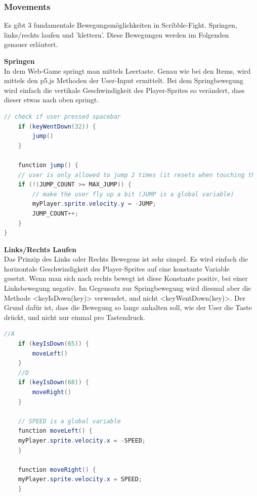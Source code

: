 \subsubsection{Movements}
Es gibt 3 fundamentale Bewegungsmöglichkeiten in Scribble-Fight. Springen, links/rechts laufen und 'klettern'. Diese Bewegungen werden im Folgenden genauer erläutert.

\textbf{Springen}
\\
In dem Web-Game springt man mittels Leertaste. Genau wie bei den Items, wird mittels den p5.js Methoden der User-Input ermittelt.
Bei dem Springbewegung wird einfach die vertikale Geschwindigkeit des Player-Sprites so verändert, dass dieser etwas nach oben springt.
\\
\begin{lstlisting}[caption=Jumping,language=Java,label=lst:impl:jumping]
    // check if user pressed spacebar
    if (keyWentDown(32)) {
        jump()
    }

    function jump() {
    // user is only allowed to jump 2 times (it resets when touching the ground)
    if (!(JUMP_COUNT >= MAX_JUMP)) {
        // make the user fly up a bit (JUMP is a global variable)
        myPlayer.sprite.velocity.y = -JUMP;
        JUMP_COUNT++;
    }
}
\end{lstlisting}

\textbf{Links/Rechts Laufen}
\\
Das Prinzip des Links oder Rechts Bewegens ist sehr simpel. Es wird einfach die horizontale Geschwindigkeit des Player-Sprites auf eine konstante Variable gesetzt.
Wenn man sich nach rechts bewegt ist diese Konstante positiv, bei einer Linksbewegung negativ. Im Gegensatz zur Springbewegung wird diesmal aber die Methode <keyIsDown(key)> verwendet, und nicht <keyWentDown(key)>.
Der Grund dafür ist, dass die Bewegung so lange anhalten soll, wie der User die Taste drückt, und nicht nur einmal pro Tastendruck.

\begin{lstlisting}[caption=Links/Rechts-Movement,language=Java,label=lst:impl:moving]
    //A
    if (keyIsDown(65)) {
        moveLeft()
    }
    //D
    if (keyIsDown(68)) {
        moveRight()
    }

    // SPEED is a global variable
    function moveLeft() {
    myPlayer.sprite.velocity.x = -SPEED;
    }

    function moveRight() {
    myPlayer.sprite.velocity.x = SPEED;
    }
\end{lstlisting}

